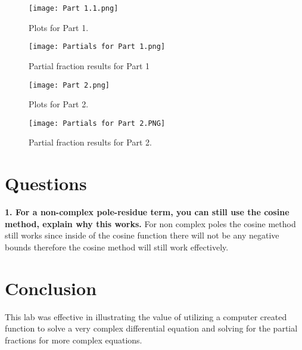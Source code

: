 \documentclass[12pt]{report}
\begin{document}
\begin{figure}[htp]
    \centering
    \texttt{[image: Part 1.1.png]}
    \caption{Plots for Part 1.}
    \label{fig:Part 1.png}
\end{figure}

\begin{figure}[htp]
    \centering
    \texttt{[image: Partials for Part 1.png]}
    \caption{Partial fraction results for Part 1}
    \label{fig:Partials for Part 1.png}
\end{figure}
\newpage

\begin{figure}[htp]
    \centering
    \texttt{[image: Part 2.png]}
    \caption{Plots for Part 2.}
    \label{fig:Part 1.png}
\end{figure}

\begin{figure}[htp]
    \centering
    \texttt{[image: Partials for Part 2.PNG]}
    \caption{Partial fraction results for Part 2.}
    \label{fig:Part 1.png}
\end{figure}
\newpage
\section{Questions}
\textbf{1. For a non-complex pole-residue term, you can still use the cosine method, explain why this works.}\newline
For non complex poles the cosine method still works since inside of the cosine function there will not be any negative bounds therefore the cosine method will still work effectively.
\section{Conclusion}
This lab was effective in illustrating the value of utilizing a computer created function to solve a very complex differential equation and solving for the partial fractions for more complex equations.
\newpage
\end{document}

